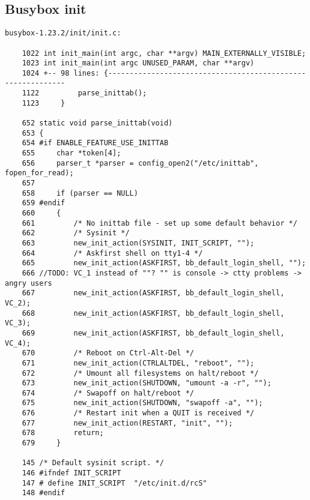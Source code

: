 \subsection{Busybox init}
\begin{framed}\begin{verbatim}
busybox-1.23.2/init/init.c:

    1022 int init_main(int argc, char **argv) MAIN_EXTERNALLY_VISIBLE;
    1023 int init_main(int argc UNUSED_PARAM, char **argv)
    1024 +-- 98 lines: {------------------------------------------------------------
    1122         parse_inittab();
    1123     }

    652 static void parse_inittab(void)
    653 {
    654 #if ENABLE_FEATURE_USE_INITTAB
    655     char *token[4];
    656     parser_t *parser = config_open2("/etc/inittab", fopen_for_read);
    657 
    658     if (parser == NULL)
    659 #endif
    660     {
    661         /* No inittab file - set up some default behavior */
    662         /* Sysinit */
    663         new_init_action(SYSINIT, INIT_SCRIPT, "");
    664         /* Askfirst shell on tty1-4 */
    665         new_init_action(ASKFIRST, bb_default_login_shell, "");
    666 //TODO: VC_1 instead of ""? "" is console -> ctty problems -> angry users
    667         new_init_action(ASKFIRST, bb_default_login_shell, VC_2);
    668         new_init_action(ASKFIRST, bb_default_login_shell, VC_3);
    669         new_init_action(ASKFIRST, bb_default_login_shell, VC_4);
    670         /* Reboot on Ctrl-Alt-Del */
    671         new_init_action(CTRLALTDEL, "reboot", "");
    672         /* Umount all filesystems on halt/reboot */
    673         new_init_action(SHUTDOWN, "umount -a -r", "");
    674         /* Swapoff on halt/reboot */
    675         new_init_action(SHUTDOWN, "swapoff -a", "");
    676         /* Restart init when a QUIT is received */
    677         new_init_action(RESTART, "init", "");
    678         return;
    679     }

    145 /* Default sysinit script. */
    146 #ifndef INIT_SCRIPT
    147 # define INIT_SCRIPT  "/etc/init.d/rcS"
    148 #endif

\end{verbatim}\end{framed}
